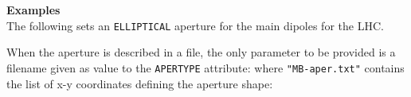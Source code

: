 \vskip 5mm


{\bf Examples}\\
The following sets an {\tt ELLIPTICAL} aperture for the main
dipoles for the LHC.

When the aperture is described in a file, the only parameter to be provided is 
a filename given as value to the {\tt APERTYPE} attribute:
where {\tt "MB-aper.txt"} contains the list of x-y coordinates defining the
aperture shape:

